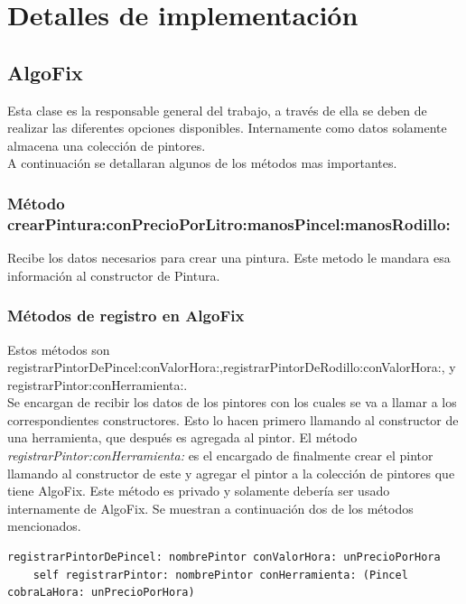 \documentclass[titlepage,a4paper]{article}
\begin{document}
\section{Detalles de implementación}\label{sec:implementacion}

\subsection{AlgoFix}
\indent Esta clase es la responsable general del trabajo, a través de ella se deben de realizar las diferentes opciones disponibles. Internamente como datos solamente almacena una colección de pintores.\\ 
\indent A continuación se detallaran algunos de los métodos mas importantes.\\
\smallskip

\subsubsection*{Método crearPintura:conPrecioPorLitro:manosPincel:manosRodillo:}
\indent Recibe los datos necesarios para crear una pintura. Este metodo le mandara esa información al constructor de Pintura.\\

\subsubsection*{Métodos de registro en AlgoFix}
\indent Estos métodos son  registrarPintorDePincel:conValorHora:,registrarPintorDeRodillo:conValorHora:, y registrarPintor:conHerramienta:.\\
\indent Se encargan de recibir los datos de los pintores con los cuales se va a llamar a los correspondientes constructores. Esto lo hacen primero llamando al constructor de una herramienta, que después es agregada al pintor. El método \textit{registrarPintor:conHerramienta:} es el encargado de finalmente crear el pintor llamando al constructor de este y agregar el pintor a la colección de pintores que tiene AlgoFix. Este método es privado y solamente debería ser usado internamente de AlgoFix. Se muestran a continuación dos de los métodos mencionados.

\begin{verbatim}
registrarPintorDePincel: nombrePintor conValorHora: unPrecioPorHora
    self registrarPintor: nombrePintor conHerramienta: (Pincel cobraLaHora: unPrecioPorHora)
\end{verbatim}
\end{document}
